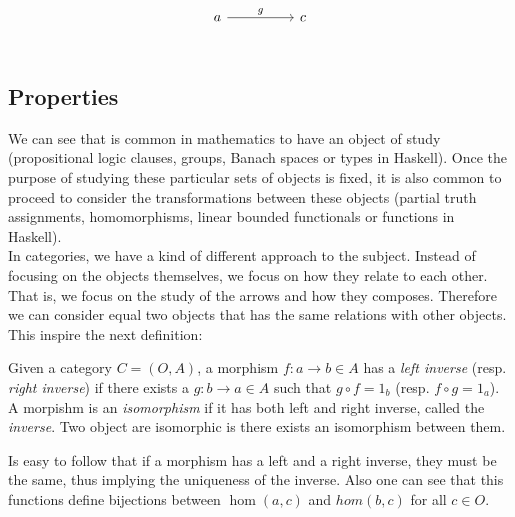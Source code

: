     \[
      \begin{tikzcd}
        a\arrow[rr, "g"] && c\\
      \end{tikzcd}
    \]




\subsection{Properties}

We can see that is common in mathematics to have an object of study (propositional logic clauses, groups, Banach spaces or types in Haskell). Once the purpose of studying these particular sets of objects is fixed, it is also common to proceed to consider the transformations between these objects (partial truth assignments, homomorphisms, linear bounded functionals or  functions in Haskell).\\

In categories, we have a kind of different approach to the subject. Instead of focusing on the objects themselves, we focus on how they relate to each other. That is, we focus on the study of the arrows and how they composes. Therefore we can consider equal two objects that has the same relations with other objects. This inspire the next definition:

\begin{definition}\cite[Definition 1.1.9]{riehl2017category}
  Given a category $C=(O,A)$, a morphism $f: a \to b \in A$ has a \emph{left inverse} (resp. \emph{right inverse}) if there exists a $g: b \to a \in A$ such that $g \circ f = 1_b$ (resp. $f \circ g = 1_a$). A morpishm is an \emph{isomorphism} if it has both left and right inverse, called the \emph{inverse}. Two object are isomorphic is there exists an isomorphism between them.
\end{definition}


Is easy to follow that if a morphism has a left and a right inverse, they must be the same, thus implying the uniqueness of the inverse. Also one can see that this functions define bijections between $\hom(a,c)$ and $hom(b,c)$ for all $c\in O$.\\


